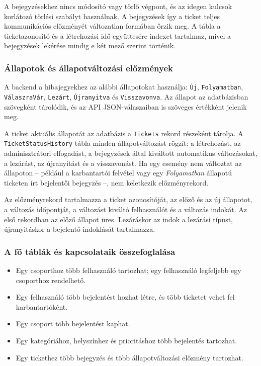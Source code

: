 \documentclass[12pt, a4paper, twoside]{article}
\begin{document}
A bejegyzésekhez nincs módosító vagy törlő végpont, és az idegen kulcsok korlátozó törlési szabályt használnak. A bejegyzések így a ticket teljes kommunikációs előzményét változatlan formában őrzik meg. A tábla a ticketazonosító és a létrehozási idő együttesére indexet tartalmaz, mivel a bejegyzések lekérése mindig e két mező szerint történik.

\subsubsection{Állapotok és állapotváltozási előzmények}

A backend a hibajegyekhez az alábbi állapotokat használja: \texttt{Új}, \texttt{Folyamatban}, \texttt{VálaszraVár}, \texttt{Lezárt}, \texttt{Újranyitva} és \texttt{Visszavonva}. Az állapot az adatbázisban szövegként tárolódik, és az API JSON-válaszaiban is szöveges értékként jelenik meg.

A ticket aktuális állapotát az adatbázis a \texttt{Tickets} rekord részeként tárolja. A \texttt{TicketStatusHistory} tábla minden állapotváltozást rögzít: a létrehozást, az adminisztrátori elfogadást, a bejegyzések által kiváltott automatikus változásokat, a lezárást, az újranyitást és a visszavonást. Ha egy esemény nem változtat az állapoton -- például a karbantartói felvétel vagy egy \textit{Folyamatban} állapotú ticketen írt bejelentői bejegyzés --, nem keletkezik előzményrekord.

Az előzményrekord tartalmazza a ticket azonosítóját, az előző és az új állapotot, a változás időpontját, a változást kiváltó felhasználót és a változás indokát. Az első rekordban az előző állapot üres. Lezáráskor az indok a lezárási típust, újranyitáskor a bejelentő indoklását tartalmazza.

\subsubsection{A fő táblák és kapcsolataik összefoglalása}

\begin{itemize}
    \item Egy csoporthoz több felhasználó tartozhat; egy felhasználó legfeljebb egy csoporthoz rendelhető.
    \item Egy felhasználó több bejelentést hozhat létre, és több ticketet vehet fel karbantartóként.
    \item Egy csoport több bejelentést kaphat.
    \item Egy kategóriához, helyszínhez és prioritáshoz több bejelentés tartozhat.
    \item Egy tickethez több bejegyzés és több állapotváltozási előzmény tartozhat.
\end{itemize}
\end{document}
